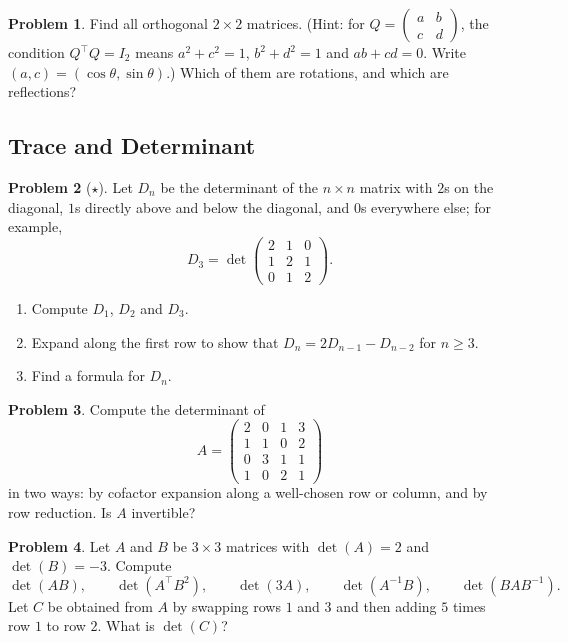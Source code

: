 \documentclass[11pt]{article}
\theoremstyle{definition}
\newtheorem{problem}{Problem}[section]
\begin{document}
\begin{problem}\label{pr:orthogonal2}
    Find all orthogonal $2 \times 2$ matrices. (Hint: for $Q = \begin{pmatrix} a & b \\ c & d \end{pmatrix}$, the condition $Q^\top Q = I_2$ means $a^2 + c^2 = 1$, $b^2 + d^2 = 1$ and $ab + cd = 0$. Write $(a, c) = (\cos\theta, \sin\theta)$.) Which of them are rotations, and which are reflections?
\end{problem}

\subsection{Trace and Determinant}

\begin{problem}[$\star$]\label{pr:tridiagonal}
    Let $D_n$ be the determinant of the $n \times n$ matrix with $2$s on the diagonal, $1$s directly above and below the diagonal, and $0$s everywhere else; for example,
    \[D_3 = \det \begin{pmatrix} 2 & 1 & 0 \\ 1 & 2 & 1 \\ 0 & 1 & 2 \end{pmatrix}.\]
    \begin{enumerate}[label=(\alph*)]
        \item Compute $D_1$, $D_2$ and $D_3$.
        \item Expand along the first row to show that $D_n = 2D_{n-1} - D_{n-2}$ for $n \geq 3$.
        \item Find a formula for $D_n$.
    \end{enumerate}
\end{problem}

\begin{problem}\label{pr:det4}
    Compute the determinant of
    \[A = \begin{pmatrix} 2 & 0 & 1 & 3 \\ 1 & 1 & 0 & 2 \\ 0 & 3 & 1 & 1 \\ 1 & 0 & 2 & 1 \end{pmatrix}\]
    in two ways: by cofactor expansion along a well-chosen row or column, and by row reduction. Is $A$ invertible?
\end{problem}

\begin{problem}\label{pr:det-rules}
    Let $A$ and $B$ be $3 \times 3$ matrices with $\det(A) = 2$ and $\det(B) = -3$. Compute
    \[\det(AB), \qquad \det(A^\top B^2), \qquad \det(3A), \qquad \det(A^{-1}B), \qquad \det(BAB^{-1}).\]
    Let $C$ be obtained from $A$ by swapping rows $1$ and $3$ and then adding $5$ times row $1$ to row $2$. What is $\det(C)$?
\end{problem}
\end{document}
